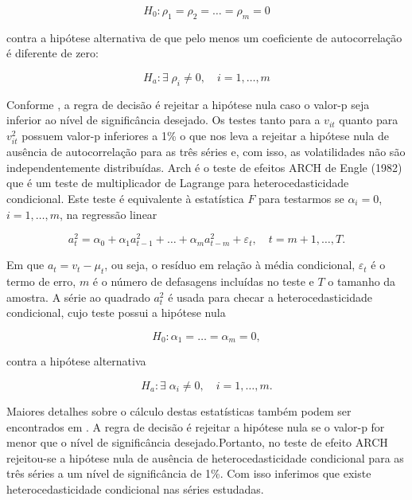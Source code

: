 \begin{equation}
 H_0: \rho_1=\rho_2=\ldots=\rho_m=0
 \end{equation}

contra a hipótese alternativa de que pelo menos um coeficiente de
autocorrelação é diferente de zero:

\begin{equation}
H_a:\exists \;\rho_i\neq 0, \quad i =1,\ldots,m
\end{equation}

Conforme , a regra de decisão é rejeitar a hipótese nula caso
o valor-p seja inferior ao nível de significância desejado. Os testes
tanto para a \(v_{it}\) quanto para \(v_{it}^2\) possuem valor-p
inferiores a 1\% o que nos leva a rejeitar a hipótese nula de ausência
de autocorrelação para as três séries e, com isso, as volatilidades não
são independentemente distribuídas. Arch é o teste de efeitos ARCH de
Engle (1982) que é um teste de multiplicador de Lagrange para
heterocedasticidade condicional. Este teste é equivalente à estatística
\(F\) para testarmos se \(\alpha_i=0\), \(i=1,\ldots,m\), na regressão
linear

\begin{equation}
a_t^2=\alpha_0+\alpha_1a_{t-1}^2+\ldots+\alpha_ma_{t-m}^2+\varepsilon_t,\quad t=m+1,\ldots,T.
\end{equation}

Em que \(a_t=v_t-\mu_t\), ou seja, o resíduo em relação à média
condicional, \(\varepsilon_t\) é o termo de erro, \(m\) é o número de
defasagens incluídas no teste e \(T\) o tamanho da amostra. A série ao
quadrado \(a_t^2\) é usada para checar a heterocedasticidade
condicional, cujo teste possui a hipótese nula

\begin{equation}
H_0:\alpha_1=\ldots=\alpha_m=0,
\end{equation}

contra a hipótese alternativa

\begin{equation}
H_a:\exists \; \alpha_i\neq 0, \quad i=1,\ldots,m.
\end{equation}

Maiores detalhes sobre o cálculo destas estatísticas também podem ser
encontrados em . A regra de decisão é rejeitar a hipótese nula
se o valor-p for menor que o nível de significância desejado.Portanto, no
teste de efeito ARCH rejeitou-se a hipótese nula de ausência de
heterocedasticidade condicional para as três séries a um nível de
significância de 1\%. Com isso inferimos que existe heterocedasticidade
condicional nas séries estudadas.

